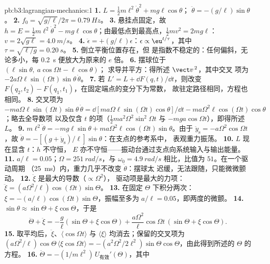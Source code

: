 \begin{solution}{pb:b3:lagrangian-mechanics:1}
\textbf{1.} $L = \tfrac12 m\ell^2\dot\theta^2 + mg\ell\cos\theta$；
$\ddot\theta = -(g/\ell)\sin\theta$。
\textbf{2.} $f_0 = \sqrt{g/\ell}/2\pi = \qty{0.79}{Hz}$。
\textbf{3.} 悬挂点固定，故 $h = E = \tfrac12
m\ell^2\dot\theta^2 - mg\ell\cos\theta$；由最低点到最高点，$\tfrac12
mv^2 = 2mg\ell$：$v = 2\sqrt{g\ell} = \qty{4.0}{m/s}$。
\textbf{4.} $\ddot\epsilon = +(g/\ell)\epsilon$：$\epsilon \propto
\eu^{t/\tau}$，其中 $\tau = \sqrt{\ell/g} = \qty{0.20}{s}$。
\textbf{5.} 倒立平衡位置存在，但
是指数不稳定的：任何偏斜，无论多小，每
\qty{0.2}{s} 便放大为原来的 $e$ 倍。
\textbf{6.} 摆球位于 $(\ell\sin\theta,\ a\cos\Omega t - \ell\cos\theta)$；
求导并平方：得所述 $\vect v^{\,2}$，其中交叉
项为 $-2a\Omega\ell\sin(\Omega t)\sin\theta\,\dot\theta$。
\textbf{7.} 若 $L' = L + \dd F(q,t)/\dd t$，则改变
$F(q_2, t_2) - F(q_1, t_1)$，在固定端点的变分下为常数，
故驻定路径相同，方程也相同。
\textbf{8.} 交叉项为 $-ma\Omega\ell\sin(\Omega t)\sin\theta\,
\dot\theta = \dd[ma\Omega\ell\sin(\Omega t)\cos\theta]/\dd t -
ma\Omega^2\ell\cos(\Omega t)\cos\theta$；略去全导数项
以及仅含 $t$ 的项（$\tfrac12 ma^2\Omega^2\sin^2\Omega t$ 与
$-mga\cos\Omega t$），即得所述 $L$。
\textbf{9.} $m\ell^2\ddot\theta = -mg\ell\sin\theta +
ma\Omega^2\ell\cos(\Omega t)\sin\theta$。由于 $\ddot y_{\text{s}} =
-a\Omega^2\cos\Omega t$，故 $\ddot\theta =
-[(g + \ddot y_{\text{s}})/\ell]\sin\theta$：在支点的参考系中，
表观重力振荡。
\textbf{10.} $L$ 现在显含 $t$：$h$ 不守恒，
$E$ 亦不守恒——振动台通过支点向系统输入与输出能量。
\textbf{11.} $a/\ell = 0.05$；$\Omega = \qty{251}{rad/s}$，与
$\omega_0 = \qty{4.9}{rad/s}$ 相比，比值为 $51$。在一个驱动周期
（\qty{25}{ms}）内，重力几乎不改变 $\dot\theta$：摆球太
迟缓，无法跟随，只能微微颤动。
\textbf{12.} $\ddot\xi$ 是最大的导数（$\propto\Omega^2$），
驱动项是最大的力项：$\ddot\xi =
(a\Omega^2/\ell)\cos(\Omega t)\sin\Theta$。
\textbf{13.} 在固定 $\Theta$ 下积分两次：$\xi =
-(a/\ell)\cos(\Omega t)\sin\Theta$，振幅至多为 $a/\ell =
0.05$，即两度的微颤。
\textbf{14.} $\sin\theta \approx \sin\Theta + \xi\cos\Theta$，于是
\[
\ddot\Theta + \ddot\xi = -\frac{g}{\ell}(\sin\Theta + \xi\cos\Theta)
 + \frac{a\Omega^2}{\ell}\cos\Omega t\,(\sin\Theta + \xi\cos\Theta) .
\]
\textbf{15.} 取平均后，$\ddot\xi$、$\langle\cos\Omega t\rangle$
与 $\langle\xi\rangle$ 均消去；保留的交叉项为
$(a\Omega^2/\ell)\cos\Theta\,\langle\xi\cos\Omega t\rangle =
-(a^2\Omega^2/2\ell^2)\sin\Theta\cos\Theta$，由此得到所述的
$\Theta$ 的方程。
\textbf{16.} $\ddot\Theta = -(1/m\ell^2)\,U_{\text{有效}}'(\Theta)$，其中

\end{solution}
